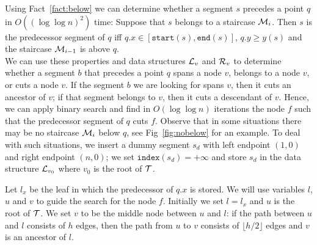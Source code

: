 \documentclass[10pt]{llncs}
\def\idtt#1{\ensuremath{\mathtt{#1}}}
\newcommand{\cL}{{\cal L}}
\newcommand{\cR}{{\cal R}}
\newcommand{\cT}{{\cal T}}
\newcommand{\cM}{{\cal M}}
\newcommand{\sindex}{\idtt{index}}
\newcommand{\sleft}{\idtt{start}}
\newcommand{\sright}{\idtt{end}}
\begin{document}
Using Fact~\ref{fact:below}
 we can determine whether a segment $s$ precedes a point $q$ 
in $O((\log\log n)^2)$ time: Suppose that $s$ belongs to a staircase 
$\cM_i$. Then $s$ is the predecessor segment of $q$ iff $q.x\in [\sleft(s),\sright(s)]$, $q.y\geq y(s)$ and the 
staircase $\cM_{i-1}$ is above $q$. \\
We can use these properties and data structures
$\cL_v$ and $\cR_v$ to determine whether a segment $b$ that precedes
 a point $q$ spans 
a node $v$, belongs to a node $v$, or cuts a node $v$. If the segment 
$b$ we are looking for spans $v$, then it cuts an ancestor of $v$; if that 
segment belongs to $v$, then it cuts a descendant of $v$. Hence, we can 
apply binary search and find in $O(\log \log n)$ iterations the node 
$f$ such that the predecessor segment of $q$ cuts $f$. 
Observe that in some situations there may be no staircase $\cM_i$ below 
$q$, see  Fig~\ref{fig:nobelow} for an example. To deal with such situations, we insert 
a dummy segment $s_d$ with left endpoint $(1,0)$ and right endpoint
$(n,0)$; we set $\sindex(s_d)=+\infty$ and store $s_d$ in the data structure 
$\cL_{v_0}$ where $v_0$ is the root of $\cT$.




Let $l_x$ be the leaf in which the predecessor of $q.x$ is stored. 
We will use variables $l$, $u$ and $v$ to guide the search for the node $f$. 
Initially we set $l=l_x$ and  $u$ is  the root of $\cT$. 
We set $v$ to be  the 
middle node between $u$ and $l$: if the path between $u$ and $l$ consists of 
$h$ edges, then the path from $u$ to $v$ consists of $\lfloor h/2\rfloor$ 
edges and $v$ is an ancestor of $l$.
\end{document}
